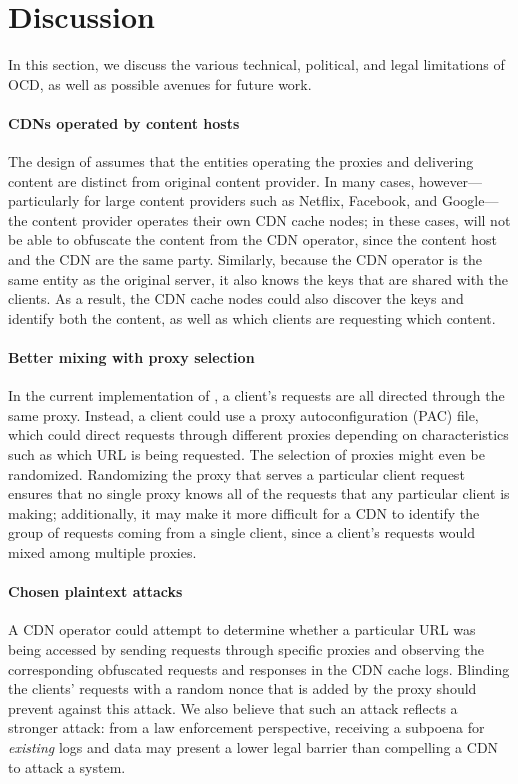 \section{Discussion}
\label{sec:discussion}

In this section, we discuss the various technical, political, and legal limitations
of OCD, as well as possible avenues for future work. 

\paragraph{CDNs operated by content hosts} The design of \system{}
assumes that the entities operating the proxies and delivering content are
distinct from original content provider. In many cases, however---particularly
for large content providers such as Netflix, Facebook, and Google---the
content provider operates their own CDN cache nodes; in these cases, \system{} will
not be able to obfuscate the content from the CDN operator, since the content host
and the CDN are the same party.  Similarly, because the CDN operator is the same
entity as the original server, it also knows the keys that are shared with the clients.
As a result, the CDN cache nodes could also discover the keys and identify both
the content, as well as which clients are requesting which content.

\paragraph{Better mixing with proxy selection} In the current implementation of
\system{}, a client's requests are all directed through the same \system{} proxy.
Instead, a client could use a proxy autoconfiguration (PAC) file, which could direct
requests through different proxies depending on characteristics such as which URL
is being requested. The selection of proxies might even be randomized.  Randomizing
the proxy that serves a particular client request ensures that no single proxy knows
all of the requests that any particular client is making; additionally, it may make
it more difficult for a CDN to identify the group of requests coming from a single
client, since a client's requests would mixed among multiple proxies. 

\paragraph{Chosen plaintext attacks} A CDN operator could attempt to
determine whether a particular URL was being accessed by sending requests
through specific \system{} proxies and observing the corresponding obfuscated
requests and responses in the CDN cache logs. Blinding the clients' requests
with a random nonce that is added by the proxy should prevent against this
attack. We also believe that such an attack reflects a stronger attack: from a
law enforcement perspective, receiving a subpoena for {\em existing} logs and
data may present a lower legal barrier than compelling a CDN to attack a
system.

